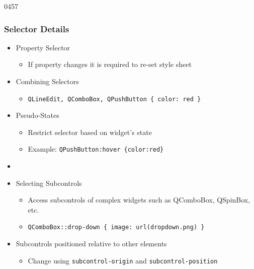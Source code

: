 \begin{slide}{0457}\frametitle{Selector Details}
\begin{itemize}
\item Property Selector
  \begin{itemize}
  \item If property changes it is required to re-set style sheet
  \end{itemize}
\item Combining Selectors
  \begin{itemize}
  \item \texttt{QLineEdit, QComboBox, QPushButton \{ color:\ red \}}
  \end{itemize}
\item Pseudo-States
  \begin{itemize}
  \item Restrict selector based on widget's state
  \item Example: \texttt{QPushButton:hover \{color:red\}}
  \end{itemize}
\item {}
\item Selecting Subcontrols
  \begin{itemize}
  \item Access subcontrols of complex widgets such as QComboBox, QSpinBox, etc.
  \item \texttt{QComboBox::drop-down \{ image: url(dropdown.png) \}}
 \end{itemize}
  \item Subcontrols positioned relative to other elements
    \begin{itemize}
  \item Change using \texttt{subcontrol-origin} and \texttt{subcontrol-position}
  \end{itemize}

\end{itemize}
\end{slide}


